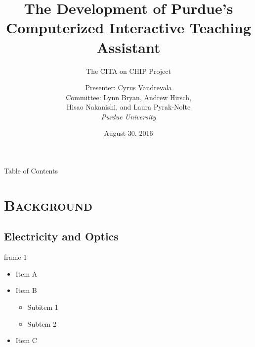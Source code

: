 \documentclass[xcolor=x11names,compress]{beamer}
\begin{document}
\beamertemplatenavigationsymbolsempty

\title{The Development of Purdue's Computerized Interactive Teaching Assistant}
\subtitle{The CITA on CHIP Project}
\author{
    Presenter: Cyrus Vandrevala\\
    \vspace{3mm}
    Committee: Lynn Bryan, Andrew Hirsch,\\
    Hisao Nakanishi, and Laura Pyrak-Nolte\\
    \vspace{3mm}
    {\it Purdue University}\\
}
\date{August 30, 2016}


\begin{frame}
    \titlepage
\end{frame}


\begin{frame}{Table of Contents}
    \tableofcontents
\end{frame}


\section{\scshape Background}

\subsection{Electricity and Optics}
\begin{frame}{frame 1}
    \begin{itemize}
    \item Item A
    \item Item B
    \begin{itemize}
    \item Subitem 1
    \item Subtem 2
    \end{itemize}
    \item Item C
    \end{itemize}
\end{frame}
\end{document}
